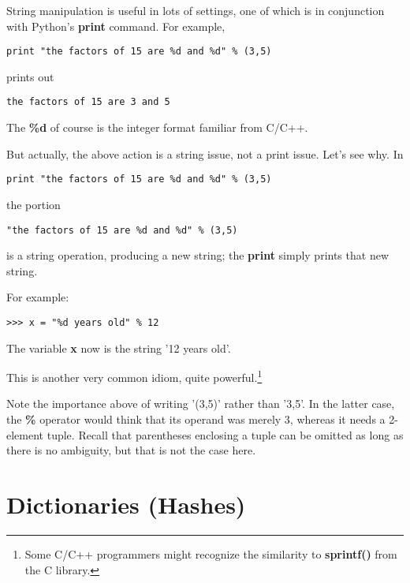 String manipulation is useful in lots of settings, one of which is in
conjunction with Python's {\bf print} command.  For example,

\begin{Verbatim}[fontsize=\relsize{-2}]
print "the factors of 15 are %d and %d" % (3,5) 
\end{Verbatim}

prints out

\begin{Verbatim}[fontsize=\relsize{-2}]
the factors of 15 are 3 and 5
\end{Verbatim}

The {\bf \%d} of course is the integer format familiar from C/C++.

But actually, the above action is a string issue, not a print issue.
Let's see why.  In

\begin{Verbatim}[fontsize=\relsize{-2}]
print "the factors of 15 are %d and %d" % (3,5) 
\end{Verbatim}

the portion

\begin{Verbatim}[fontsize=\relsize{-2}]
"the factors of 15 are %d and %d" % (3,5) 
\end{Verbatim}

is a string operation, producing a new string; the {\bf print} simply
prints that new string.  

For example:

\begin{Verbatim}[fontsize=\relsize{-2}]
>>> x = "%d years old" % 12
\end{Verbatim}

The variable {\bf x} now is the string '12 years old'.

This is another very common idiom, quite powerful.\footnote{Some C/C++
programmers might recognize the similarity to {\bf sprintf()} from the C
library.}

Note the importance above of writing '(3,5)' rather than '3,5'.  In the
latter case, the {\bf \%} operator would think that its operand was
merely 3, whereas it needs a 2-element tuple.  Recall that parentheses
enclosing a tuple can be omitted as long as there is no ambiguity, but
that is not the case here.

\section{Dictionaries (Hashes)}
\label{hashes}

